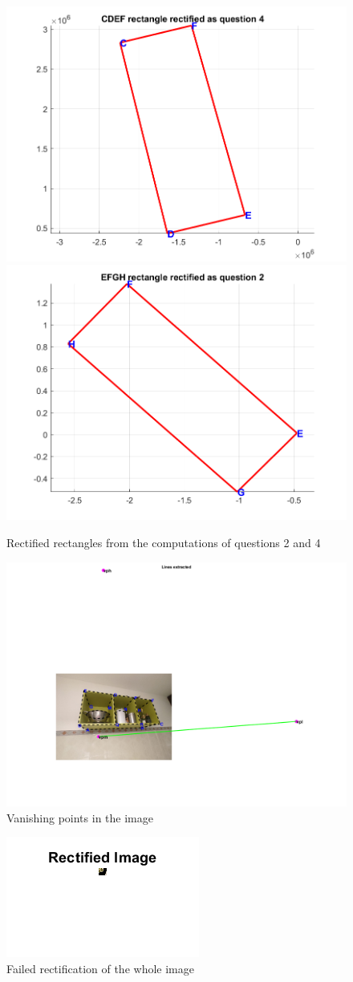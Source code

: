 \documentclass[a4paper, 11pt, oneside, openright, english]{article}
\begin{document}
\begin{figure}[H]
    \centering
    \includegraphics[width=.49\textwidth]{output/rectified_CDEF.png}
    \includegraphics[width=.49\textwidth]{output/rectified_EFGH.png}
    \caption{Rectified rectangles from the computations of questions 2 and 4}
    \label{fig:rectified_rects}
\end{figure}

\begin{figure}[H]
    \centering
    \includegraphics[width=.8\textwidth]{output/img_with_lines_and_vp.png}
    \caption{Vanishing points in the image}
    \label{fig:vanishing_points}
\end{figure}

\begin{figure}[H]
    \centering
    \includegraphics[width=.5\textwidth]{output/rectified_img.png}
    \caption{Failed rectification of the whole image}
    \label{fig:failed_rec}
\end{figure}
\end{document}
